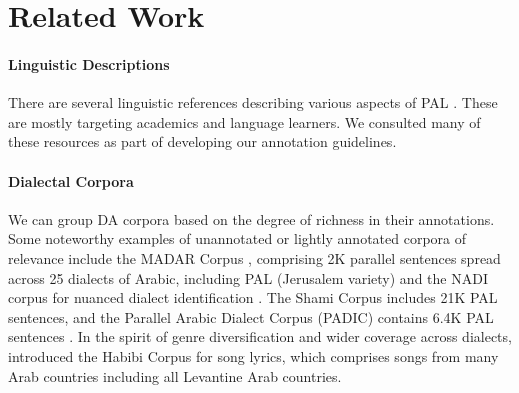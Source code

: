 \section*{Related Work}
%
\label{related}


\paragraph{Linguistic Descriptions} There are several linguistic references describing various aspects of PAL \citep{Rice:1979:eastern, herzallah1990aspects, hopkins1995sarar, elihai2004olive, talmon200419th, bassal2012hebrew, cotter2015sociolinguistics}. These are mostly targeting academics and language learners. We consulted many of these resources as part of developing our annotation guidelines.



\paragraph{Dialectal Corpora}
We can group DA corpora based on the degree of richness in their annotations.
%
Some noteworthy examples of unannotated or lightly annotated corpora of relevance include the MADAR Corpus \citep{Bouamor:2018:madar}, comprising 2K parallel sentences spread across 25 dialects of Arabic, including PAL (Jerusalem variety) and the NADI corpus for nuanced dialect identification \citep{abdulmageed2021nadi}. The Shami Corpus \citep{abu-kwaik-etal-2018-shami} includes 21K PAL sentences, and the Parallel Arabic Dialect Corpus (PADIC) contains 6.4K PAL sentences \citep{Meftouh:2015:machine}. In the spirit of genre diversification and wider coverage across dialects, \citep{el-haj-2020-habibi}  introduced the Habibi Corpus for song lyrics, which comprises songs from many Arab countries including all Levantine Arab countries.

